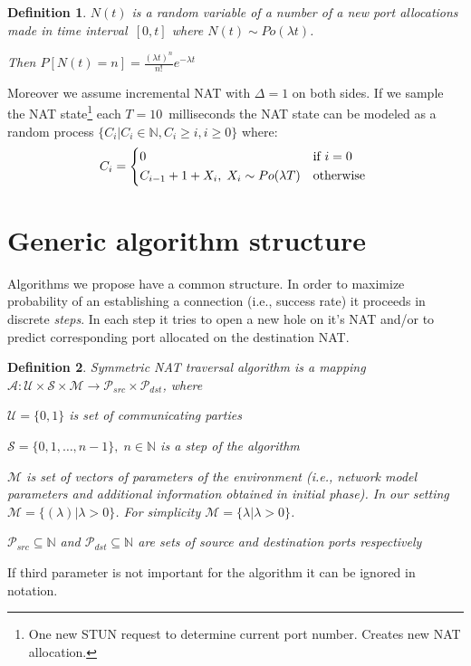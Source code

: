 \documentclass[twoside]{article}
\newtheorem{mydef}{Definition}
\begin{document}
\begin{multicols}{2}
\begin{mydef}
$N(t)$ is a random variable of a number of a new port allocations made in time 
interval~$[0,t]$ where $N(t) \sim Po(\lambda t)$. \\ 
                                                      
\begin{center}                                                     
Then $P[N(t)=n] = \frac{(\lambda t)^n}{n!} e^{-\lambda t}$
\end{center}
\end{mydef}

Moreover we assume incremental NAT with $\Delta=1$ on both sides. If we sample the NAT 
state\footnote{One new STUN request to determine current port number. Creates new NAT allocation.}
each $T=10$~milliseconds the NAT state can be modeled as a random process $\{C_i | C_i \in \mathbb{N}, C_i \geq i, i\geq0\}$ where:
\[
C_i = \begin{dcases*}
         0 & if $i=0$ \\
         C_{i-1} + 1 + X_i, \; X_i \sim Po(\lambda T) & otherwise 
        \end{dcases*}
\]

\section{Generic algorithm structure}
Algorithms we propose have a common structure. In order to maximize probability of an establishing
a connection (i.e., success rate) it proceeds in discrete \emph{steps}. In each step it 
tries to open a new hole on it's NAT and/or to predict corresponding port allocated on the destination
NAT.

\begin{mydef}
Symmetric NAT traversal algorithm is a mapping 
$\mathcal{A}: \mathcal{U} \times \mathcal{S} \times \mathcal{M} \rightarrow \mathcal{P}_{src} \times \mathcal{P}_{dst}$, 
where \\
\begin{compactitem}
\item $\mathcal{U}=\{0,1\}$ is set of communicating parties
\item $\mathcal{S} = \{0, 1, \dots, n-1\}, \; n \in \mathbb{N}$ is a step of the algorithm
\item $\mathcal{M}$ is set of vectors of parameters of the environment (i.e., network model 
parameters and additional information obtained in initial phase). 
In our setting $\mathcal{M} = \{ (\lambda) | \lambda > 0 \}$. For simplicity $\mathcal{M} = \{ \lambda | \lambda > 0 \}$.
\item $\mathcal{P}_{src} \subseteq \mathbb{N}$ and $\mathcal{P}_{dst} \subseteq \mathbb{N}$
are sets of source and destination ports respectively
\end{compactitem}
\end{mydef}
If third parameter is not important for the algorithm it can be ignored in notation.


\end{multicols}
\end{document}
